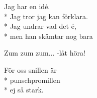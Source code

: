 \begin{SongText}
\begin{SongVerse}
    \end{SongVerse}
    \begin{SongVerse}
        Jag har en idé.\\*%
        Jag tror jag kan förklara.\\*%
        Jag undrar vad det é,\\*%
        men han skämtar nog bara
    \end{SongVerse}
    \begin{SongVerse}
        Zum zum zum... -låt höra!
    \end{SongVerse}
    \begin{SongVerse}
        För oss snillen är\\*%
        punschpromillen\\*%
        ej så stark.
    \end{SongVerse}\end{SongText}

